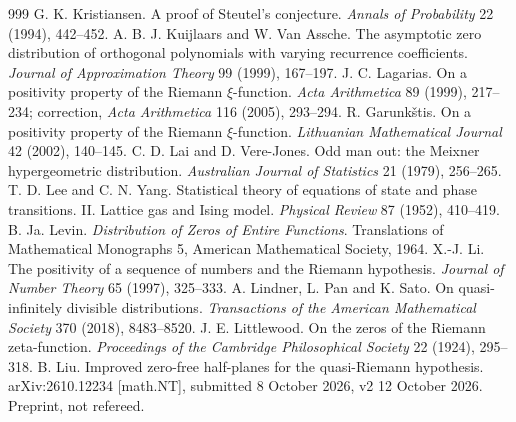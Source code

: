 \begin{thebibliography}{999}
 G. K. Kristiansen. A proof of Steutel's conjecture. \emph{Annals of Probability} 22 (1994), 442--452.
 A. B. J. Kuijlaars and W. Van Assche. The asymptotic zero distribution of orthogonal polynomials with varying recurrence coefficients. \emph{Journal of Approximation Theory} 99 (1999), 167--197.
 J. C. Lagarias. On a positivity property of the Riemann $\xi$-function. \emph{Acta Arithmetica} 89 (1999), 217--234; correction, \emph{Acta Arithmetica} 116 (2005), 293--294. %
 R. Garunk\v{s}tis. On a positivity property of the Riemann $\xi$-function. \emph{Lithuanian Mathematical Journal} 42 (2002), 140--145. %
 C. D. Lai and D. Vere-Jones. Odd man out: the Meixner hypergeometric distribution. \emph{Australian Journal of Statistics} 21 (1979), 256--265.
 T. D. Lee and C. N. Yang. Statistical theory of equations of state and phase transitions. II. Lattice gas and Ising model. \emph{Physical Review} 87 (1952), 410--419.
 B. Ja. Levin. \emph{Distribution of Zeros of Entire Functions}. Translations of Mathematical Monographs 5, American Mathematical Society, 1964.
 X.-J. Li. The positivity of a sequence of numbers and the Riemann hypothesis. \emph{Journal of Number Theory} 65 (1997), 325--333.
 A. Lindner, L. Pan and K. Sato. On quasi-infinitely divisible distributions. \emph{Transactions of the American Mathematical Society} 370 (2018), 8483--8520.
 J. E. Littlewood. On the zeros of the Riemann zeta-function. \emph{Proceedings of the Cambridge Philosophical Society} 22 (1924), 295--318.
 B. Liu. Improved zero-free half-planes for the quasi-Riemann hypothesis. arXiv:2610.12234 [math.NT], submitted 8 October 2026, v2 12 October 2026. Preprint, not refereed. %

\end{thebibliography}
